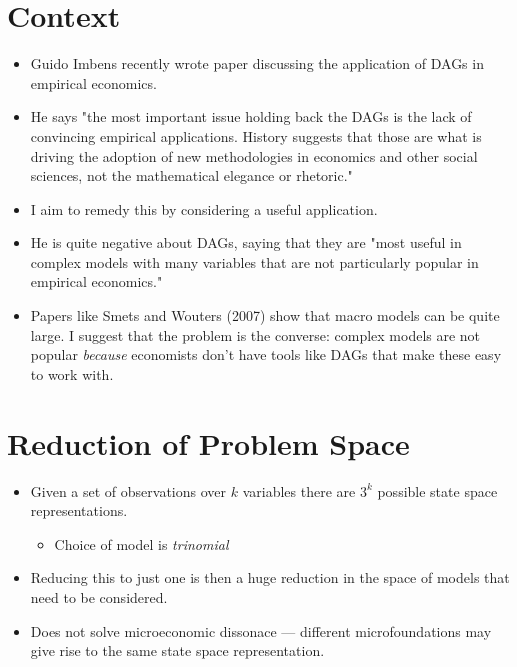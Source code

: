 \documentclass{article}
\begin{document}
\section*{Context}
\begin{itemize}
    \item Guido Imbens recently wrote paper discussing the application of DAGs in empirical economics.
    \item He says "the most important issue holding back the DAGs is the lack of convincing empirical applications. History suggests that those are what is driving the adoption of new methodologies in economics and other social sciences, not the mathematical elegance or rhetoric."
    \item I aim to remedy this by considering a useful application.
    \item He is quite negative about DAGs, saying that they are "most useful in complex models with many variables that are not particularly popular in empirical economics."
    \item Papers like Smets and Wouters (2007) show that macro models can be quite large. I suggest that the problem is the converse: complex models are not popular \textit{because} economists don't have tools like DAGs that make these easy to work with.
\end{itemize}

\section*{Reduction of Problem Space}
\begin{itemize}
    \item Given a set of observations over $k$ variables there are $3^k$ possible state space representations.
    \begin{itemize}
        \item Choice of model is \textit{trinomial}
    \end{itemize}
    \item Reducing this to just one is then a huge reduction in the space of models that need to be considered.
    \item Does not solve microeconomic dissonace --- different microfoundations may give rise to the same state space representation.
\end{itemize}
\end{document}
